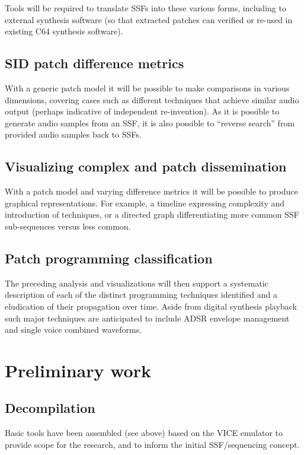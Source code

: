 \documentclass[10pt]{article}
\begin{document}
\begin{multicols*}{2}
  Tools will be required to translate SSFs into these various forms,
  including to external synthesis software (so that extracted patches
  can verified or re-used in existing C64 synthesis software).

  \subsection{SID patch difference metrics}
  With a generic patch model it will be possible to make comparisons
  in various dimensions, covering cases such as different techniques
  that achieve similar audio output (perhaps indicative of
  independent re-invention). As it is possible to generate audio
  samples from an SSF, it is also possible to ``reverse search'' from
  provided audio samples back to SSFs.

  \subsection{Visualizing complex and patch dissemination}
  With a patch model and varying difference metrics it will be
  possible to produce graphical representations. For example, a
  timeline expressing complexity and introduction of techniques,
  or a directed graph differentiating more common SSF sub-sequences
  versus less common.

  \subsection{Patch programming classification}
  The preceding analysis and visualizations will then support
  a systematic description of each of the distinct programming
  techniques identified and a eludication of their propagation
  over time. Aside from digital synthesis playback such major
  techniques are anticipated to include ADSR envelope
  management and single voice combined waveforms.

  \section{Preliminary work}

  \subsection{Decompilation}
  Basic tools have been assembled (see above) based on the VICE
  emulator to provide scope for the research, and to inform
  the initial SSF/sequencing concept.


\end{multicols*}
\end{document}

